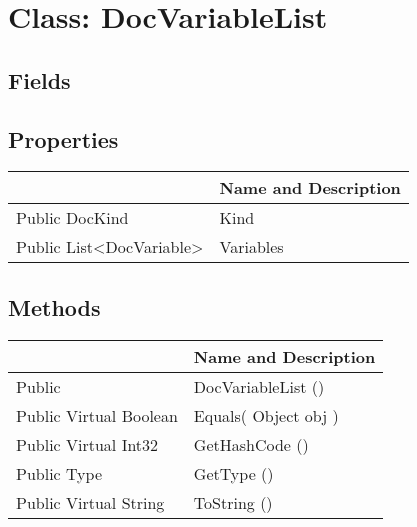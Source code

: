\documentclass[11pt, oneside, a4paper]{book}
\begin{document}
\hypertarget{SoftwareEngineeringTools.{}Documentation.{}DocVariableList}{}
\section{Class: DocVariableList}

\subsection{Fields}

\subsection{Properties}
\begin{center}
\begin{tabular}{| p{3cm} | p{12cm} | }
\hline
\textbf{ } & \textbf{ Name and Description}\\
\hline
 Public  DocKind &  Kind\hypertarget{SoftwareEngineeringTools.{}Documentation.{}DocVariableList.{}Kind}{}\\
\hline
 Public  List<DocVariable> &  Variables\hypertarget{SoftwareEngineeringTools.{}Documentation.{}DocVariableList.{}Variables}{}\\
\hline
\end{tabular}
\end{center}

\subsection{Methods}
\begin{center}
\begin{tabular}{| p{3cm} | p{12cm} | }
\hline
\textbf{ } & \textbf{ Name and Description}\\
\hline
 Public  &  DocVariableList ()\hypertarget{SoftwareEngineeringTools.{}Documentation.{}DocVariableList.{}DocVariableList}{}\\
\hline
 Public  Virtual  Boolean &  Equals(\hypertarget{SoftwareEngineeringTools.{}Documentation.{}DocVariableList.{}Equals\_Object}{} Object  obj  )\\
\hline
 Public  Virtual  Int32 &  GetHashCode ()\hypertarget{SoftwareEngineeringTools.{}Documentation.{}DocVariableList.{}GetHashCode}{}\\
\hline
 Public  Type &  GetType ()\hypertarget{SoftwareEngineeringTools.{}Documentation.{}DocVariableList.{}GetType}{}\\
\hline
 Public  Virtual  String &  ToString ()\hypertarget{SoftwareEngineeringTools.{}Documentation.{}DocVariableList.{}ToString}{}\\
\hline
\end{tabular}
\end{center}
 
\end{document}
